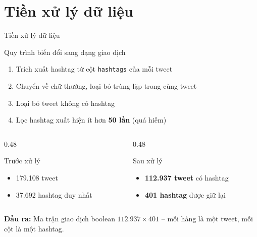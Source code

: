 \documentclass[aspectratio=169]{beamer}
\begin{document}
\section{Tiền xử lý dữ liệu}

\begin{frame}{Tiền xử lý dữ liệu}
  \begin{block}{Quy trình biến đổi sang dạng giao dịch}
    \begin{enumerate}
      \item Trích xuất hashtag từ cột \texttt{hashtags} của mỗi tweet
      \item Chuyển về chữ thường, loại bỏ trùng lặp trong cùng tweet
      \item Loại bỏ tweet không có hashtag
      \item Lọc hashtag xuất hiện ít hơn \textbf{50 lần} (quá hiếm)
    \end{enumerate}
  \end{block}

  \vspace{0.4em}

  \begin{columns}[T]
    \begin{column}{0.48\textwidth}
      \begin{alertblock}{Trước xử lý}
        \begin{itemize}
          \item 179.108 tweet
          \item 37.692 hashtag duy nhất
        \end{itemize}
      \end{alertblock}
    \end{column}
    \begin{column}{0.48\textwidth}
      \begin{exampleblock}{Sau xử lý}
        \begin{itemize}
          \item \textbf{112.937 tweet} có hashtag
          \item \textbf{401 hashtag} được giữ lại
        \end{itemize}
      \end{exampleblock}
    \end{column}
  \end{columns}

  \vspace{0.4em}
  \textbf{Đầu ra:} Ma trận giao dịch boolean $112.937 \times 401$ -- mỗi hàng là một tweet, mỗi cột là một hashtag.
\end{frame}
\end{document}
